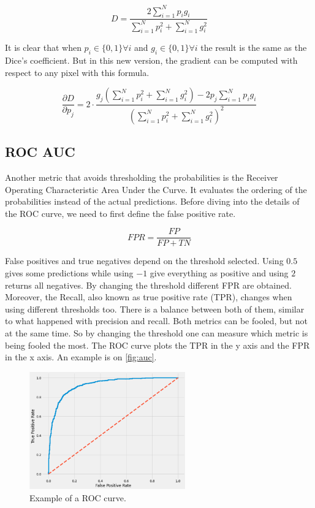 \begin{equation}
    D = \frac{2 \sum_{i=1}^N p_i g_i}{\sum_{i=1}^N p_i^2 + \sum_{i=1}^N g_i^2}
\end{equation}

It is clear that when $p_i \in \{0,1\} \forall i$ and $g_i \in \{0,1\} \forall i$ the result is the same as the Dice's coefficient. But in this new version, the gradient can be computed with respect to any pixel with this formula.

\begin{equation}
    \frac{\partial D}{\partial p_j} = 2\cdot \frac{g_j\left(\sum_{i=1}^N p_i^2 + \sum_{i=1}^N g_i^2\right) - 2p_j \sum_{i=1}^N p_ig_i}{\left(\sum_{i=1}^N p_i^2 + \sum_{i=1}^N g_i^2 \right)^2}
\end{equation}

\subsection{ROC AUC}

Another metric that avoids thresholding the probabilities is the Receiver Operating Characteristic Area Under the Curve. It evaluates the ordering of the probabilities instead of the actual predictions. Before diving into the details of the ROC curve, we need to first define the false positive rate.

\begin{equation}
    FPR = \frac{FP}{FP + TN}
\end{equation}

False positives and true negatives depend on the threshold selected. Using $0.5$ gives some predictions while using $-1$ give everything as positive and using $2$ returns all negatives. By changing the threshold different FPR are obtained. Moreover, the Recall, also known as true positive rate (TPR), changes when using different thresholds too. There is a balance between both of them, similar to what happened with precision and recall. Both metrics can be fooled, but not at the same time. So by changing the threshold one can measure which metric is being fooled the most. The ROC curve plots the TPR in the y axis and the FPR in the x axis. An example is on \autoref{fig:auc}.

\begin{figure}[ht]
    \centering
    \includegraphics[width=0.6\textwidth]{imgs/auc.png}
    \caption{Example of a ROC curve.}
    \label{fig:auc}
\end{figure}

